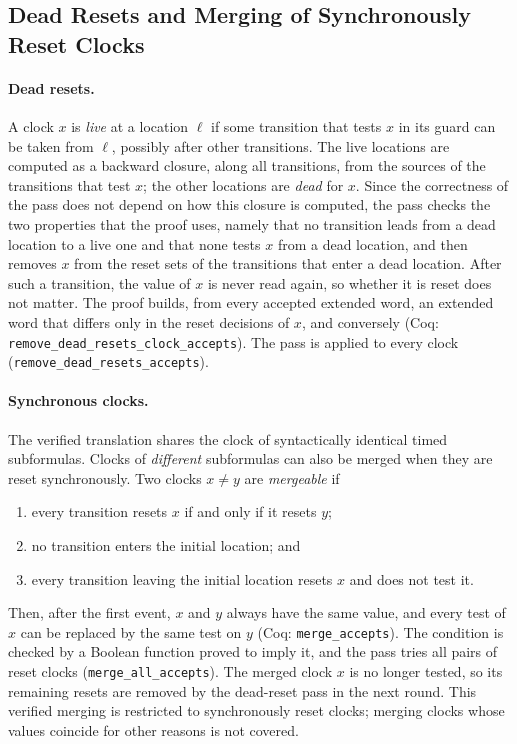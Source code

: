 \subsection{Dead Resets and Merging of Synchronously Reset Clocks}
\label{sec:dead-merge}
\paragraph{Dead resets.}
A clock $x$ is \emph{live} at a location $\ell$ if some transition that tests
$x$ in its guard can be taken from $\ell$, possibly after other transitions.
The live locations are computed as a backward closure, along all
transitions, from the sources of the transitions that test $x$; the other
locations are \emph{dead} for $x$.  Since the correctness of the pass does
not depend on how this closure is computed, the pass checks the two
properties that the proof uses, namely that no transition leads from a dead
location to a live one and that none tests $x$ from a dead location, and then removes $x$ from the reset sets of the
transitions that enter a dead location.  After such a transition, the value of
$x$ is never read again, so whether it is reset does not matter.  The proof
builds, from every accepted extended word, an extended word that differs only
in the reset decisions of $x$, and conversely (Coq:
\texttt{remove\_\allowbreak{}dead\_\allowbreak{}resets\_\allowbreak{}clock\_\allowbreak{}accepts}).  The pass is applied
to every clock (\texttt{remove\_\allowbreak{}dead\_\allowbreak{}resets\_\allowbreak{}accepts}).

\paragraph{Synchronous clocks.}
The verified translation shares the clock of syntactically identical timed
subformulas.  Clocks of \emph{different} subformulas can also be merged when
they are reset synchronously.  Two clocks $x\neq y$ are \emph{mergeable} if
\begin{enumerate}[label=(\roman*)]
  \item every transition resets $x$ if and only if it resets $y$;
  \item no transition enters the initial location; and
  \item every transition leaving the initial location resets $x$ and does not
        test it.
\end{enumerate}
Then, after the first event, $x$ and $y$ always have the same value, and every
test of $x$ can be replaced by the same test on $y$ (Coq:
\texttt{merge\_\allowbreak{}accepts}).  The condition is checked by a Boolean function
proved to imply it, and the pass tries all pairs of reset clocks
(\texttt{merge\_\allowbreak{}all\_\allowbreak{}accepts}).  The merged clock $x$ is no longer tested,
so its remaining resets are removed by the dead-reset pass in the next round.
This verified merging is restricted to synchronously reset clocks; merging
clocks whose values coincide for other reasons is not covered.

